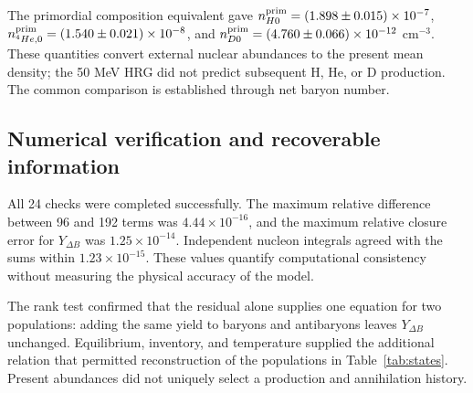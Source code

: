 The primordial composition equivalent gave $n_{H0}^{\rm prim}=(1.898\pm0.015)\times10^{-7}$, $n_{{}^4He,0}^{\rm prim}=(1.540\pm0.021)\times10^{-8}$, and $n_{D0}^{\rm prim}=(4.760\pm0.066)\times10^{-12}$ cm$^{-3}$. These quantities convert external nuclear abundances to the present mean density; the 50 MeV HRG did not predict subsequent H, He, or D production. The common comparison is established through net baryon number.

\subsection{Numerical verification and recoverable information}
All 24 checks were completed successfully. The maximum relative difference between 96 and 192 terms was $4.44\times10^{-16}$, and the maximum relative closure error for $Y_{\Delta B}$ was $1.25\times10^{-14}$. Independent nucleon integrals agreed with the sums within $1.23\times10^{-15}$. These values quantify computational consistency without measuring the physical accuracy of the model.

The rank test confirmed that the residual alone supplies one equation for two populations: adding the same yield to baryons and antibaryons leaves $Y_{\Delta B}$ unchanged. Equilibrium, inventory, and temperature supplied the additional relation that permitted reconstruction of the populations in Table~\ref{tab:states}. Present abundances did not uniquely select a production and annihilation history.
